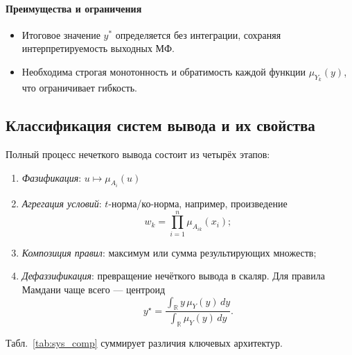 \paragraph{Преимущества и ограничения}
\begin{itemize}
  \item Итоговое значение $y^*$ определяется без интеграции, сохраняя интерпретируемость выходных МФ.
  \item Необходима строгая монотонность и обратимость каждой функции $\mu_{Y_k}(y)$, что ограничивает гибкость.
\end{itemize}



\subsection{Классификация систем вывода и их свойства}
\label{subsec:classification}

Полный процесс нечеткого вывода состоит из четырёх этапов:

\begin{enumerate}
  \item \emph{Фазификация}: $u\mapsto\mu_{A_i}(u)$
  \item \emph{Агрегация условий}: $t$-норма/ко-норма,
        например, произведение
        \begin{equation}
          w_k=\prod_{i=1}^{n}\mu_{A_{ik}}(x_i);
          \label{eq:tprod}
        \end{equation}
  \item \emph{Композиция правил}: максимум или сумма
        результирующих множеств;
  \item \emph{Дефаззификация}: превращение
        нечёткого вывода в скаляр.  
        Для правила Мамдани чаще всего —
        центроид
        \begin{equation}
          y^\star=\frac{\displaystyle
                     \int_{\mathbb R} y\,\mu_Y(y)\,dy}
                     {\displaystyle\int_{\mathbb R}\mu_Y(y)\,dy}.
          \label{eq:centroid}
        \end{equation}
\end{enumerate}

Табл.~\ref{tab:sys_comp} суммирует различия ключевых архитектур.

